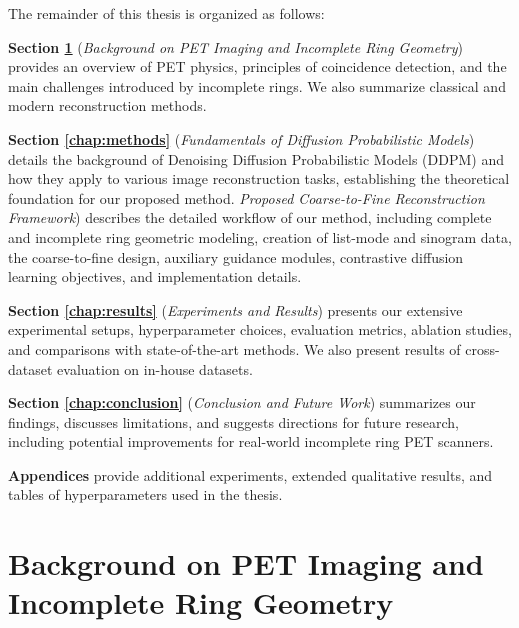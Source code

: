\documentclass[
reprint,
superscriptaddress,
nofootinbib,
amsmath,amssymb,
aps,
prd,
]{revtex4-2}
\begin{document}
The remainder of this thesis is organized as follows:

\textbf{Section \ref{chap:background}} (\emph{Background on PET Imaging and Incomplete Ring Geometry}) provides an overview of PET physics, principles of coincidence detection, and the main challenges introduced by incomplete rings. We also summarize classical and modern reconstruction methods.

\textbf{Section \ref{chap:methods}} (\emph{Fundamentals of Diffusion Probabilistic Models}) details the background of Denoising Diffusion Probabilistic Models (DDPM) and how they apply to various image reconstruction tasks, establishing the theoretical foundation for our proposed method. \emph{Proposed Coarse-to-Fine Reconstruction Framework}) describes the detailed workflow of our method, including complete and incomplete ring geometric modeling, creation of list-mode and sinogram data, the coarse-to-fine design, auxiliary guidance modules, contrastive diffusion learning objectives, and implementation details.

\textbf{Section \ref{chap:results}} (\emph{Experiments and Results}) presents our extensive experimental setups, hyperparameter choices, evaluation metrics, ablation studies, and comparisons with state-of-the-art methods. We also present results of cross-dataset evaluation on in-house datasets.

\textbf{Section \ref{chap:conclusion}} (\emph{Conclusion and Future Work}) summarizes our findings, discusses limitations, and suggests directions for future research, including potential improvements for real-world incomplete ring PET scanners.

\textbf{Appendices} provide additional experiments, extended qualitative results, and tables of hyperparameters used in the thesis.


\section{Background on PET Imaging and Incomplete Ring Geometry}
\label{chap:background}
\end{document}
